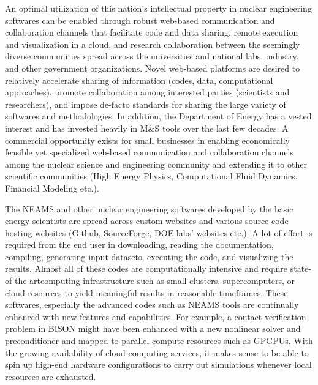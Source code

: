 An optimal utilization of this nation's intellectual property in nuclear 
engineering softwares can be enabled through
robust web-based communication and collaboration channels that facilitate code 
and data sharing, remote execution and visualization in a 
cloud, and research collaboration between the seemingly 
diverse communities spread across the 
universities and national labs, industry, and other government organizations. 
Novel web-based platforms are desired to 
relatively accelerate sharing of information (codes, data, computational 
approaches), promote collaboration among interested parties (scientists and 
researchers), and impose de-facto standards for sharing the large variety of 
softwares and methodologies. In 
addition, the Department of Energy has a vested 
interest and has invested heavily in M\&S tools over the last few decades. A 
commercial opportunity exists for small 
businesses in enabling economically feasible yet specialized web-based 
communication and collaboration channels among the 
nuclear science and engineering community and extending it to other scientific 
communities (High Energy Physics, 
Computational Fluid Dynamics, Financial Modeling etc.).

The NEAMS and other nuclear engineering softwares developed by the basic energy 
scientists are spread across custom 
websites and various source code hosting websites (Github, SourceForge, DOE 
labs' websites etc.). A lot of effort is 
required from the end user in downloading, reading the documentation, 
compiling, generating input datasets, executing 
the code, and visualizing the results. Almost all of these codes are 
computationally intensive and require 
state-of-the-artcomputing infrastructure such as small clusters, 
supercomputers, or cloud resources to yield meaningful 
results in reasonable timeframes. These softwares, especially the advanced 
codes such as NEAMS tools are continually 
enhanced with new features and capabilities. For example, a contact 
verification problem in BISON might have been 
enhanced with a new nonlinear solver and preconditioner and mapped to parallel 
compute resources such as GPGPUs. With the growing availability of cloud 
computing services, it makes sense to be able to spin up high-end hardware 
configurations to carry out simulations whenever local resources are exhausted.


